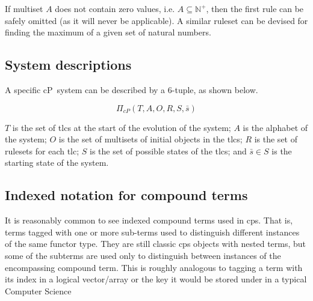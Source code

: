 If multiset \(A\) does not contain zero values, i.e. \(A \subseteq \mathbb{N}^+\), then the first rule can be safely omitted (as it will never be applicable). 
A similar ruleset can be devised for finding the maximum of a given set of natural numbers.


\subsection{\label{sec:nmp:notation}System descriptions}
A specific cP~system can be described by a 6-tuple, as shown below.

\[
\Pi_{cP}(T, A, O, R, S, \bar{s})
\]

\(T\) is the set of \glspl{tlc} at the start of the evolution of the system; \(A\) is the alphabet of the system; \(O\) is the set of multisets of initial objects in the \glspl{tlc}; \(R\) is the set of rulesets for each \gls{tlc}; \(S\) is the set of possible states of the \glspl{tlc}; and \(\bar{s} \in S\) is the starting state of the system.


\subsection{\label{sec:nmp:compoundterms}Indexed notation for compound terms}

It is reasonably common to see indexed compound terms used in \gls{cps}.  That is, terms tagged with one or more sub-terms used to distinguish different instances of the same functor type.  They are still classic \gls{cps} objects with nested terms, but some of the subterms are used only to distinguish between instances of the encompassing compound term.  This is roughly analogous to tagging a term with its index in a logical vector/array or the key it would be stored under in a typical Computer Science 

